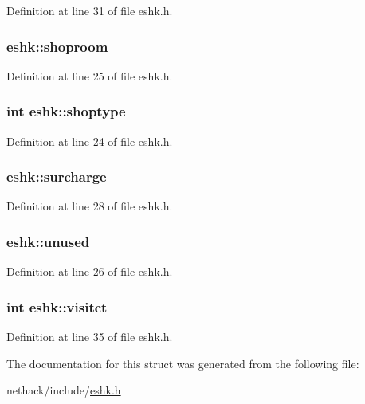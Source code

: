 Definition at line 31 of file eshk.\+h.

\hypertarget{structeshk_ad95d79157dfcdfdb073d0dcaa87da43d}{
\subsubsection[{shoproom}]{ eshk\+::shoproom}}\label{structeshk_ad95d79157dfcdfdb073d0dcaa87da43d}


Definition at line 25 of file eshk.\+h.

\hypertarget{structeshk_aa1c9ca9144c5d5ba321fd5d0a7428456}{
\subsubsection[{shoptype}]{\setlength{\rightskip}{0pt plus 5cm}int eshk\+::shoptype}}\label{structeshk_aa1c9ca9144c5d5ba321fd5d0a7428456}


Definition at line 24 of file eshk.\+h.

\hypertarget{structeshk_a563676db07c70fedb8f039b162b9aac5}{
\subsubsection[{surcharge}]{ eshk\+::surcharge}}\label{structeshk_a563676db07c70fedb8f039b162b9aac5}


Definition at line 28 of file eshk.\+h.

\hypertarget{structeshk_a38a72b842c11a39703c2d37d0a83b873}{
\subsubsection[{unused}]{ eshk\+::unused}}\label{structeshk_a38a72b842c11a39703c2d37d0a83b873}


Definition at line 26 of file eshk.\+h.

\hypertarget{structeshk_ab0bab205113220e61df9e8d2395540e1}{
\subsubsection[{visitct}]{\setlength{\rightskip}{0pt plus 5cm}int eshk\+::visitct}}\label{structeshk_ab0bab205113220e61df9e8d2395540e1}


Definition at line 35 of file eshk.\+h.



The documentation for this struct was generated from the following file\+:\begin{DoxyCompactItemize}
\item 
nethack/include/\hyperlink{eshk_8h}{eshk.\+h}\end{DoxyCompactItemize}

